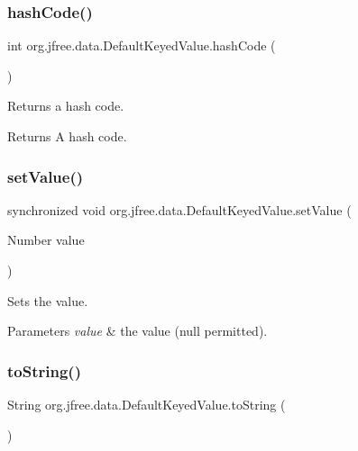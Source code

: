 \subsubsection{\texorpdfstring{hash\+Code()}{hashCode()}}
{\footnotesize\ttfamily int org.\+jfree.\+data.\+Default\+Keyed\+Value.\+hash\+Code (\begin{DoxyParamCaption}{ }\end{DoxyParamCaption})}

Returns a hash code.

\begin{DoxyReturn}{Returns}
A hash code. 
\end{DoxyReturn}
\mbox{\label{classorg_1_1jfree_1_1data_1_1_default_keyed_value_aff39dcaceec4386ef50fb16e5e6d8856}} 
\subsubsection{\texorpdfstring{set\+Value()}{setValue()}}
{\footnotesize\ttfamily synchronized void org.\+jfree.\+data.\+Default\+Keyed\+Value.\+set\+Value (\begin{DoxyParamCaption}\item[{Number}]{value }\end{DoxyParamCaption})}

Sets the value.


\begin{DoxyParams}{Parameters}
{\em value} & the value ({\ttfamily null} permitted). \\
\hline
\end{DoxyParams}
\mbox{\label{classorg_1_1jfree_1_1data_1_1_default_keyed_value_adcfb1d3adfffaf084ee5d6718ad4e609}} 
\subsubsection{\texorpdfstring{to\+String()}{toString()}}
{\footnotesize\ttfamily String org.\+jfree.\+data.\+Default\+Keyed\+Value.\+to\+String (\begin{DoxyParamCaption}{ }\end{DoxyParamCaption})}

